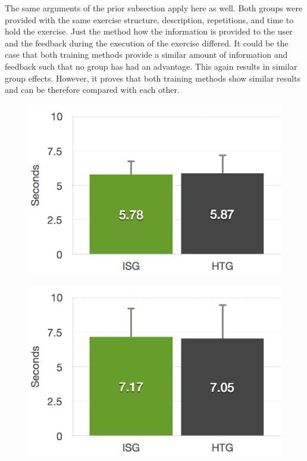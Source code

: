 The same arguments of the prior subsection \textit{} apply here as well.
Both groups were provided with the same exercise structure, description, repetitions, and time to hold the exercise.
Just the method how the information is provided to the user and the feedback during the execution of the exercise differed.
It could be the case that both training methods provide a similar amount of information and feedback such that no group has had an advantage.
This again results in similar group effects.
However, it proves that both training methods show similar results and can be therefore compared with each other.
\begin{figure}[htb]
	\centering
	\begin{minipage}[t]{0.40\linewidth}
		\centering
		\includegraphics[width=1\linewidth]{Pictures/6_4_DIA_StandLeftGroupEffect}
		\label{fig:6_4_standLeftGroupEffect}
	\end{minipage}
	\hfill
	\begin{minipage}[t]{0.40\linewidth}
		\centering
		\includegraphics[width=1\linewidth]{Pictures/6_4_DIA_StandRightGroupEffect}

\end{minipage}
\end{figure}
